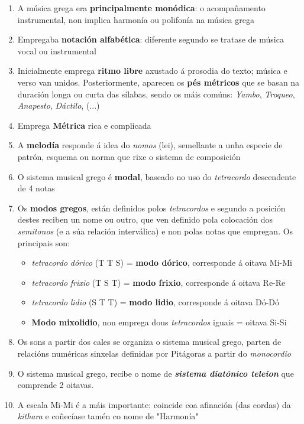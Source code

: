 \begin{multicols}{2}
    \begin{enumerate}[1)]
    \item
    A música grega era \textbf{principalmente monódica}: o acompañamento instrumental, non implica harmonía ou polifonía na música grega
    \item
    Empregaba \textbf{notación alfabética}:  diferente segundo se tratase de música vocal ou instrumental
    \item
    Inicialmente emprega \textbf{ritmo libre} axustado á prosodia do texto; música e verso van unidos. Posteriormente, aparecen os \textbf{pés métricos} que se basan na duración longa ou curta das sílabas, sendo os máis comúns: \textit{Yambo}, \textit{Troqueo}, \textit{Anapesto}, \textit{Dáctilo}, (...)
    \item
    Emprega \textbf{Métrica} rica e complicada
    \item
    A \textbf{melodía} responde á idea do \textit{nomos} (lei), semellante a unha especie de patrón, esquema ou norma que rixe o sistema de composición
    \item
    O sistema musical grego é \textbf{modal}, baseado no uso do \textit{tetracordo} descendente de 4 notas
    \item
    Os \textbf{modos gregos}, están definidos polos \textit{tetracordos} e segundo a posición destes reciben un nome ou outro, que ven definido pola colocación dos \textit{semitonos} (e a súa relación interválica) e non polas notas que empregan. Os principais son:
        \begin{itemize}
            \item
            \textit{tetracordo} \textit{dórico} (T T S) = \textbf{modo dórico}, corresponde á oitava Mi-Mi
            \item
            \textit{tetracordo} \textit{frixio} (T S T) = \textbf{modo frixio}, corresponde á oitava Re-Re
            \item
            \textit{tetracordo} \textit{lidio} (S T T) = \textbf{modo lidio}, corresponde á oitava Dó-Dó
            \item
            \textbf{Modo mixolidio}, non emprega dous \textit{tetracordos} iguais = oitava Si-Si
        \end{itemize}
    \item
    Os sons a partir dos cales se organiza o sistema musical grego, parten de relacións numéricas sinxelas definidas por Pitágoras a partir do \textit{monocordio}
    \item
    O sistema musical grego, recibe o nome de \textbf{\textit{sistema diatónico teleion}} que comprende 2 oitavas.
    \item
    A escala Mi-Mi é a máis importante: coincide coa afinación (das cordas) da \textit{kithara} e coñecíase tamén co nome de "Harmonía"
    \end{enumerate}
\end{multicols}
%
